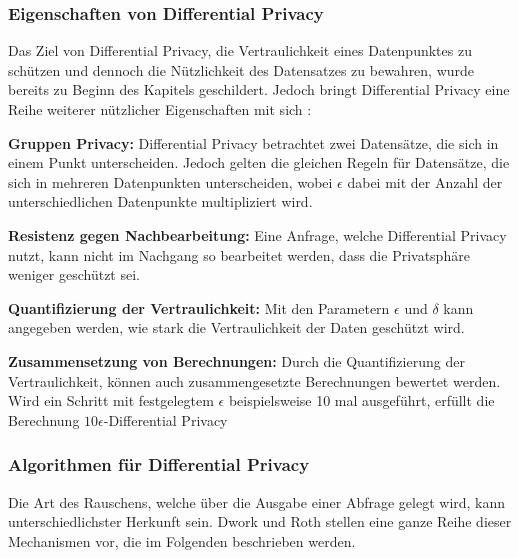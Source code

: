 \subsubsection*{Eigenschaften von Differential Privacy}
Das Ziel von Differential Privacy, die Vertraulichkeit eines Datenpunktes zu schützen und dennoch die Nützlichkeit des Datensatzes zu bewahren, wurde bereits zu Beginn des Kapitels geschildert.
Jedoch bringt Differential Privacy eine Reihe weiterer nützlicher Eigenschaften mit sich \cite{P-27}:
\begin{compactitem}
    \item \textbf{Gruppen Privacy:} Differential Privacy betrachtet zwei Datensätze, die sich in einem Punkt unterscheiden. Jedoch gelten die gleichen Regeln für Datensätze, die sich in mehreren Datenpunkten unterscheiden, wobei $\epsilon$ dabei mit der Anzahl der unterschiedlichen Datenpunkte multipliziert wird.
    \item \textbf{Resistenz gegen Nachbearbeitung:} Eine Anfrage, welche Differential Privacy nutzt, kann nicht im Nachgang so bearbeitet werden, dass die Privatsphäre weniger geschützt sei.
    \item \textbf{Quantifizierung der Vertraulichkeit:} Mit den Parametern $\epsilon$ und $\delta$ kann angegeben werden, wie stark die Vertraulichkeit der Daten geschützt wird.
    \item \textbf{Zusammensetzung von Berechnungen:} Durch die Quantifizierung der Vertraulichkeit, können auch zusammengesetzte Berechnungen bewertet werden. Wird ein Schritt mit festgelegtem $\epsilon$ beispielsweise 10 mal ausgeführt, erfüllt die Berechnung $10\epsilon$-Differential Privacy
\end{compactitem}


\subsubsection*{Algorithmen für Differential Privacy}
Die Art des Rauschens, welche über die Ausgabe einer Abfrage gelegt wird, kann unterschiedlichster Herkunft sein.
Dwork und Roth \cite{P-27} stellen eine ganze Reihe dieser Mechanismen vor, die im Folgenden beschrieben werden.

